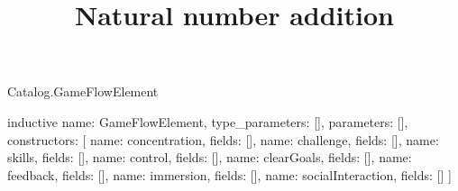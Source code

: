 \begin{lexlean}{Catalog.GameFlowElement}
\title{Natural number addition}
\begin{semanticmodule}
inductive{
  name: GameFlowElement,
  type_parameters: [],
  parameters: [],
  constructors: [
    {name: concentration, fields: []},
    {name: challenge, fields: []},
    {name: skills, fields: []},
    {name: control, fields: []},
    {name: clearGoals, fields: []},
    {name: feedback, fields: []},
    {name: immersion, fields: []},
    {name: socialInteraction, fields: []}
  ]
}
\end{semanticmodule}
\end{lexlean}
